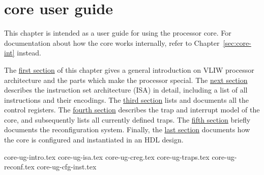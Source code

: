 \chapter{\rvex{} core user guide}
\label{sec:core-ug}

This chapter is intended as a user guide for using the \rvex{} processor core.
For documentation about how the core works internally, refer to
Chapter~\ref{sec:core-int} instead.

The \hyperref[sec:core-ug-intro]{first section} of this chapter gives a general 
introduction on VLIW processor architecture and the parts which make the \rvex{} 
processor special. The \hyperref[sec:core-ug-isa]{next section} describes the 
instruction set architecture (ISA) in detail, including a list of all 
instructions and their encodings. The \hyperref[sec:core-ug-creg]{third section} 
lists and documents all the control registers. The 
\hyperref[sec:core-ug-traps]{fourth section} describes the trap and interrupt 
model of the core, and subsequently lists all currently defined traps. The 
\hyperref[sec:core-ug-reconf]{fifth section} briefly documents the 
reconfiguration system. Finally, the \hyperref[sec:core-ug-cfg-inst]{last 
section} documents how the core is configured and instantiated in an HDL design.

{core-ug-intro.tex}
{core-ug-isa.tex}
{core-ug-creg.tex}
{core-ug-traps.tex}
{core-ug-reconf.tex}
{core-ug-cfg-inst.tex}
